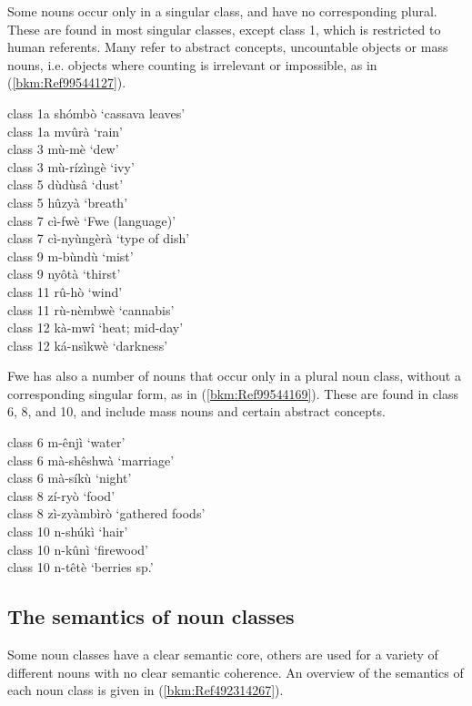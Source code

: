 Some nouns occur only in a singular class, and have no corresponding plural. These are found in most singular classes, except class 1, which is restricted to human referents. Many refer to abstract concepts, uncountable objects or mass nouns, i.e. objects where counting is irrelevant or impossible, as in (\ref{bkm:Ref99544127}).

\ea
\label{bkm:Ref99544127}
class 1a  shómbò    ‘cassava leaves’\\
class 1a  mvûrà      ‘rain’\\
class 3    mù-mè    ‘dew’\\
class 3    mù-rízìngè    ‘ivy’\\
class 5    dùdùsâ    ‘dust’\\
class 5    hûzyà      ‘breath’\\
class 7    cì-fwè      ‘Fwe (language)’\\
class 7    cì-nyùngèrà    ‘type of dish’\\
class 9    m-bùndù    ‘mist’\\
class 9    nyôtà      ‘thirst’\\
class 11  rû-hò      ‘wind’\\
class 11  rù-nèmbwè    ‘cannabis’\\
class 12  kà-mwî    ‘heat; mid-day’\\
class 12  ká-nsìkwè    ‘darkness’
\z

Fwe has also a number of nouns that occur only in a plural noun class, without a corresponding singular form, as in (\ref{bkm:Ref99544169}). These are found in class 6, 8, and 10, and include mass nouns and certain abstract concepts.

\ea
\label{bkm:Ref99544169}
class 6    m-ênjì    ‘water’\\
class 6    mà-shêshwà    ‘marriage’\\
class 6    mà-síkù    ‘night’\\
class 8    zí-ryò      ‘food’\\
class 8    zì-zyàmbìrò    ‘gathered foods’\\
class 10  n-shúkì    ‘hair’\\
class 10  n-kûnì    ‘firewood’\\
class 10  n-têtè      ‘berries sp.’
\z
\subsection{The semantics of noun classes}
\hypertarget{Toc75352639}{}\label{bkm:Ref499035982}\label{bkm:Ref498357105}\label{bkm:Ref450750293}\label{bkm:Ref450747845}\label{bkm:Ref450747827}\label{bkm:Ref450747802}\label{bkm:Ref450747656}\label{bkm:Ref444190057}
Some noun classes have a clear semantic core, others are used for a variety of different nouns with no clear semantic coherence. An overview of the semantics of each noun class is given in (\ref{bkm:Ref492314267}).

